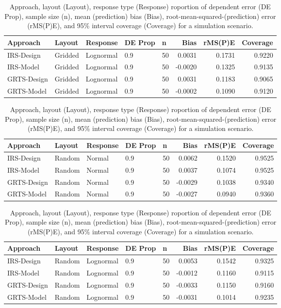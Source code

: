 \documentclass[]{elsarticle} %
\begin{document}
\begin{table}[ht]
\centering
\begin{tabular}{lllllrrr}
  \hline
Approach & Layout & Response & DE Prop & n & Bias & rMS(P)E & Coverage \\ 
  \hline
IRS-Design & Gridded & Lognormal & 0.9 & 50 & 0.0031 & 0.1731 & 0.9220 \\ 
  IRS-Model & Gridded & Lognormal & 0.9 & 50 & -0.0020 & 0.1325 & 0.9135 \\ 
  GRTS-Design & Gridded & Lognormal & 0.9 & 50 & 0.0031 & 0.1183 & 0.9065 \\ 
  GRTS-Model & Gridded & Lognormal & 0.9 & 50 & -0.0002 & 0.1090 & 0.9120 \\ 
   \hline
\end{tabular}
\caption{Approach, layout (Layout), response type (Response) roportion of dependent error (DE Prop), sample size (n), mean (prediction) bias (Bias), root-mean-squared-(prediction) error (rMS(P)E), and 95\% interval coverage (Coverage) for a simulation scenario.} 
\end{table}
\begin{table}[ht]
\centering
\begin{tabular}{lllllrrr}
  \hline
Approach & Layout & Response & DE Prop & n & Bias & rMS(P)E & Coverage \\ 
  \hline
IRS-Design & Random & Normal & 0.9 & 50 & 0.0062 & 0.1520 & 0.9525 \\ 
  IRS-Model & Random & Normal & 0.9 & 50 & 0.0037 & 0.1074 & 0.9525 \\ 
  GRTS-Design & Random & Normal & 0.9 & 50 & -0.0029 & 0.1038 & 0.9340 \\ 
  GRTS-Model & Random & Normal & 0.9 & 50 & -0.0027 & 0.0940 & 0.9360 \\ 
   \hline
\end{tabular}
\caption{Approach, layout (Layout), response type (Response) roportion of dependent error (DE Prop), sample size (n), mean (prediction) bias (Bias), root-mean-squared-(prediction) error (rMS(P)E), and 95\% interval coverage (Coverage) for a simulation scenario.} 
\end{table}
\begin{table}[ht]
\centering
\begin{tabular}{lllllrrr}
  \hline
Approach & Layout & Response & DE Prop & n & Bias & rMS(P)E & Coverage \\ 
  \hline
IRS-Design & Random & Lognormal & 0.9 & 50 & 0.0053 & 0.1542 & 0.9325 \\ 
  IRS-Model & Random & Lognormal & 0.9 & 50 & -0.0012 & 0.1160 & 0.9115 \\ 
  GRTS-Design & Random & Lognormal & 0.9 & 50 & -0.0033 & 0.1150 & 0.9160 \\ 
  GRTS-Model & Random & Lognormal & 0.9 & 50 & -0.0031 & 0.1014 & 0.9235 \\ 
   \hline
\end{tabular}
\caption{Approach, layout (Layout), response type (Response) roportion of dependent error (DE Prop), sample size (n), mean (prediction) bias (Bias), root-mean-squared-(prediction) error (rMS(P)E), and 95\% interval coverage (Coverage) for a simulation scenario.} 
\end{table}
\end{document}
